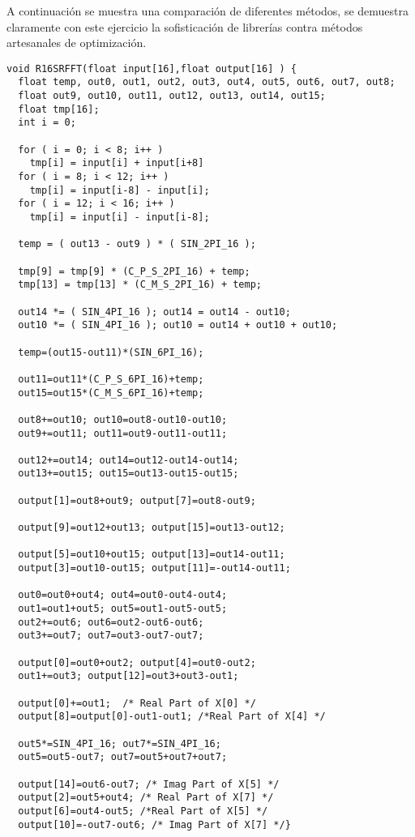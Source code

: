 \documentclass[a4paper]{report}
\begin{document}
\bigskip

A continuaci\'on se muestra una comparaci\'on de diferentes m\'etodos, se
demuestra claramente con este ejercicio la sofisticaci\'on de librer\'ias
contra m\'etodos artesanales de optimizaci\'on.

\begin{verbatim}
void R16SRFFT(float input[16],float output[16] ) {
  float temp, out0, out1, out2, out3, out4, out5, out6, out7, out8;
  float out9, out10, out11, out12, out13, out14, out15;
  float tmp[16];
  int i = 0;

  for ( i = 0; i < 8; i++ )
    tmp[i] = input[i] + input[i+8]
  for ( i = 8; i < 12; i++ )
    tmp[i] = input[i-8] - input[i];
  for ( i = 12; i < 16; i++ )
    tmp[i] = input[i] - input[i-8];

  temp = ( out13 - out9 ) * ( SIN_2PI_16 ); 

  tmp[9] = tmp[9] * (C_P_S_2PI_16) + temp; 
  tmp[13] = tmp[13] * (C_M_S_2PI_16) + temp;
  
  out14 *= ( SIN_4PI_16 ); out14 = out14 - out10;
  out10 *= ( SIN_4PI_16 ); out10 = out14 + out10 + out10;
  
  temp=(out15-out11)*(SIN_6PI_16);

  out11=out11*(C_P_S_6PI_16)+temp;
  out15=out15*(C_M_S_6PI_16)+temp;

  out8+=out10; out10=out8-out10-out10;
  out9+=out11; out11=out9-out11-out11;

  out12+=out14; out14=out12-out14-out14;
  out13+=out15; out15=out13-out15-out15;

  output[1]=out8+out9; output[7]=out8-out9;

  output[9]=out12+out13; output[15]=out13-out12;
  
  output[5]=out10+out15; output[13]=out14-out11;
  output[3]=out10-out15; output[11]=-out14-out11;
  
  out0=out0+out4; out4=out0-out4-out4;
  out1=out1+out5; out5=out1-out5-out5;
  out2+=out6; out6=out2-out6-out6;
  out3+=out7; out7=out3-out7-out7;

  output[0]=out0+out2; output[4]=out0-out2;
  out1+=out3; output[12]=out3+out3-out1;

  output[0]+=out1;  /* Real Part of X[0] */
  output[8]=output[0]-out1-out1; /*Real Part of X[4] */

  out5*=SIN_4PI_16; out7*=SIN_4PI_16;
  out5=out5-out7; out7=out5+out7+out7;

  output[14]=out6-out7; /* Imag Part of X[5] */
  output[2]=out5+out4; /* Real Part of X[7] */
  output[6]=out4-out5; /*Real Part of X[5] */
  output[10]=-out7-out6; /* Imag Part of X[7] */}
\end{verbatim}
\end{document}
